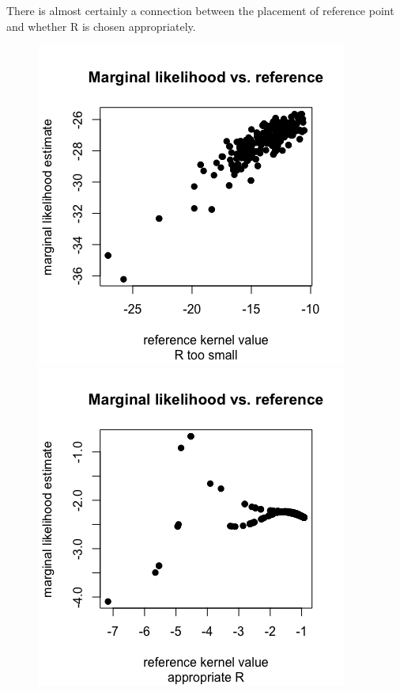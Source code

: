 \documentclass[%
 reprint,
 amsmath,amssymb,
 aps,
]{revtex4-2}
\begin{document}
There is almost certainly a connection between the placement of reference point and whether R is chosen appropriately. 
\begin{figure}[h!]
    \centering
    \includegraphics[scale=0.25]{figures/temporary/FItoosmallR.png}
    \includegraphics[scale=0.25]{figures/temporary/FIappropriateR.png}

\end{figure}
\end{document}
